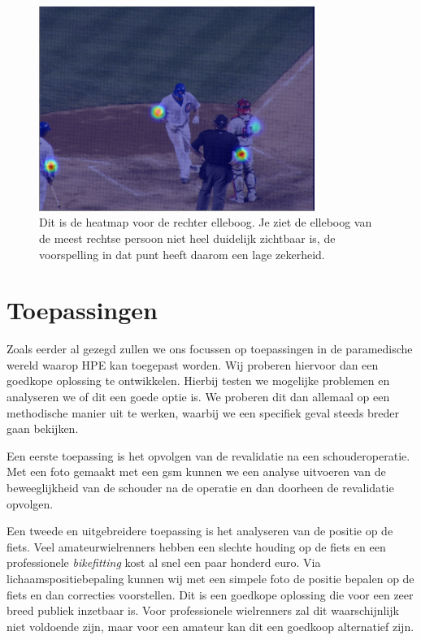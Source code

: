 \documentclass[a4paper,twoside,kulak]{kulakreport}
\begin{document}
\begin{figure}
	\centering
	\label{heatmap}
	\includegraphics[width=0.8\textwidth]{heatmap_1}
	\caption{Dit is de heatmap voor de rechter elleboog. Je ziet de elleboog van de meest rechtse persoon niet heel duidelijk zichtbaar is, de voorspelling in dat punt heeft daarom een lage zekerheid.}
\end{figure}


\chapter{Toepassingen}
Zoals eerder al gezegd zullen we ons focussen op toepassingen in de paramedische wereld waarop HPE kan toegepast worden. Wij proberen hiervoor dan een goedkope oplossing te ontwikkelen. Hierbij testen we mogelijke problemen en analyseren we of dit  een goede optie is. We proberen dit dan allemaal op een methodische manier uit te werken, waarbij we een specifiek geval steeds breder gaan bekijken.

Een eerste toepassing is het opvolgen van de revalidatie na een schouderoperatie. Met een foto gemaakt met een gsm kunnen we een analyse uitvoeren van de beweeglijkheid van de schouder na de operatie en dan doorheen de revalidatie opvolgen.

Een tweede en uitgebreidere toepassing is het analyseren van de positie op de fiets. Veel amateurwielrenners hebben een slechte houding op de fiets en een professionele \emph{bikefitting} kost al snel een paar honderd euro. Via lichaamspositiebepaling kunnen wij met een simpele foto de positie bepalen op de fiets en dan correcties voorstellen. Dit is een goedkope oplossing die voor een zeer breed publiek inzetbaar is. Voor professionele wielrenners zal dit waarschijnlijk niet voldoende zijn, maar voor een amateur kan dit een goedkoop alternatief zijn.
\end{document}
